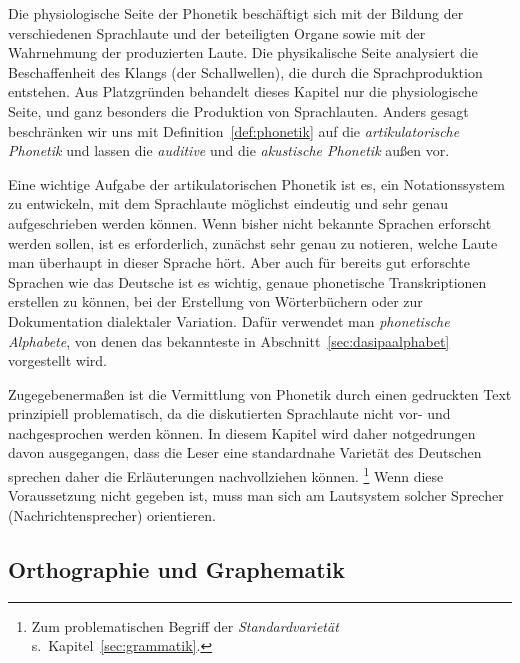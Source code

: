 Die physiologische Seite der Phonetik beschäftigt sich mit der Bildung der verschiedenen Sprachlaute und der beteiligten Organe sowie mit der Wahrnehmung der produzierten Laute.
Die physikalische Seite analysiert die Beschaffenheit des Klangs (der Schallwellen), die durch die Sprachproduktion entstehen.
Aus Platzgründen behandelt dieses Kapitel nur die physiologische Seite, und ganz besonders die Produktion von Sprachlauten.
Anders gesagt beschränken wir uns mit Definition~\ref{def:phonetik} auf die \textit{artikulatorische Phonetik} und lassen die \textit{auditive} und die \textit{akustische Phonetik} außen vor.


Eine wichtige Aufgabe der artikulatorischen Phonetik ist es, ein Notationssystem zu entwickeln, mit dem Sprachlaute möglichst eindeutig und sehr genau aufgeschrieben werden können.
Wenn bisher nicht bekannte Sprachen erforscht werden sollen, ist es \zB erforderlich, zunächst sehr genau zu notieren, welche Laute man überhaupt in dieser Sprache hört.
Aber auch für bereits gut erforschte Sprachen wie das Deutsche ist es wichtig, genaue phonetische Transkriptionen erstellen zu können, \zB bei der Erstellung von Wörterbüchern oder zur Dokumentation dialektaler Variation.
Dafür verwendet man \textit{phonetische Alphabete}, von denen das bekannteste in Abschnitt~\ref{sec:dasipaalphabet} vorgestellt wird.

Zugegebenermaßen ist die Vermittlung von Phonetik durch einen gedruckten Text prinzipiell problematisch, da die diskutierten Sprachlaute nicht vor- und nachgesprochen werden können.
In diesem Kapitel wird daher notgedrungen davon ausgegangen, dass die Leser eine standardnahe Varietät des Deutschen sprechen daher die Erläuterungen nachvollziehen können.%
\footnote{Zum problematischen Begriff der \textit{Standardvarietät} s.\ Kapitel~\ref{sec:grammatik}.}
Wenn diese Voraussetzung nicht gegeben ist, muss man sich am Lautsystem solcher Sprecher (\zB Nachrichtensprecher) orientieren.

\subsection{Orthographie und Graphematik}
\label{sec:orthographieundgraphematik}

